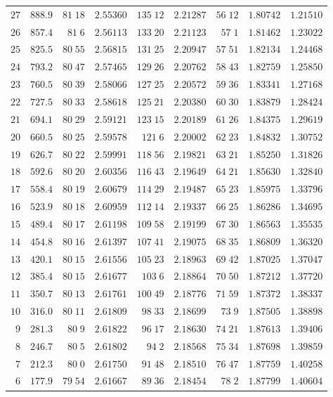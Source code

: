 \begin{center}
\begin{tabular}{r|r|r|r|r|r|r|r|r}
$27$&$888.9$&$81\;18$&$2.55360$&$135\;12$&$2.21287$&$56\;12$&$1.80742$&$1.21510$\\
$26$&$857.4$&$81\;6$&$2.56113$&$133\;20$&$2.21123$&$57\;1$&$1.81462$&$1.23022$\\[2pt]
$25$&$825.5$&$80\;55$&$2.56815$&$131\;25$&$2.20947$&$57\;51$&$1.82134$&$1.24468$\\
$24$&$793.2$&$80\;47$&$2.57465$&$129\;26$&$2.20762$&$58\;43$&$1.82759$&$1.25850$\\
$23$&$760.5$&$80\;39$&$2.58066$&$127\;25$&$2.20572$&$59\;36$&$1.83341$&$1.27168$\\
$22$&$727.5$&$80\;33$&$2.58618$&$125\;21$&$2.20380$&$60\;30$&$1.83879$&$1.28424$\\
$21$&$694.1$&$80\;29$&$2.59121$&$123\;15$&$2.20189$&$61\;26$&$1.84375$&$1.29619$\\[2pt]
$20$&$660.5$&$80\;25$&$2.59578$&$121\;6$&$2.20002$&$62\;23$&$1.84832$&$1.30752$\\
$19$&$626.7$&$80\;22$&$2.59991$&$118\;56$&$2.19821$&$63\;21$&$1.85250$&$1.31826$\\
$18$&$592.6$&$80\;20$&$2.60356$&$116\;43$&$2.19649$&$64\;21$&$1.85630$&$1.32840$\\
$17$&$558.4$&$80\;19$&$2.60679$&$114\;29$&$2.19487$&$65\;23$&$1.85975$&$1.33796$\\
$16$&$523.9$&$80\;18$&$2.60959$&$112\;14$&$2.19337$&$66\;25$&$1.86286$&$1.34695$\\[2pt]
$15$&$489.4$&$80\;17$&$2.61198$&$109\;58$&$2.19199$&$67\;30$&$1.86563$&$1.35535$\\
$14$&$454.8$&$80\;16$&$2.61397$&$107\;41$&$2.19075$&$68\;35$&$1.86809$&$1.36320$\\
$13$&$420.1$&$80\;15$&$2.61556$&$105\;23$&$2.18963$&$69\;42$&$1.87025$&$1.37047$\\
$12$&$385.4$&$80\;15$&$2.61677$&$103\;6$&$2.18864$&$70\;50$&$1.87212$&$1.37720$\\
$11$&$350.7$&$80\;13$&$2.61761$&$100\;49$&$2.18776$&$71\;59$&$1.87372$&$1.38337$\\[2pt]
$10$&$316.0$&$80\;11$&$2.61809$&$98\;33$&$2.18699$&$73\;9$&$1.87505$&$1.38898$\\
$9$&$281.3$&$80\;9$&$2.61822$&$96\;17$&$2.18630$&$74\;21$&$1.87613$&$1.39406$\\
$8$&$246.7$&$80\;5$&$2.61802$&$94\;2$&$2.18568$&$75\;34$&$1.87698$&$1.39859$\\
$7$&$212.3$&$80\;0$&$2.61750$&$91\;48$&$2.18510$&$76\;47$&$1.87759$&$1.40258$\\
$6$&$177.9$&$79\;54$&$2.61667$&$89\;36$&$2.18454$&$78\;2$&$1.87799$&$1.40604$\\[2pt]

\end{tabular}
\end{center}
